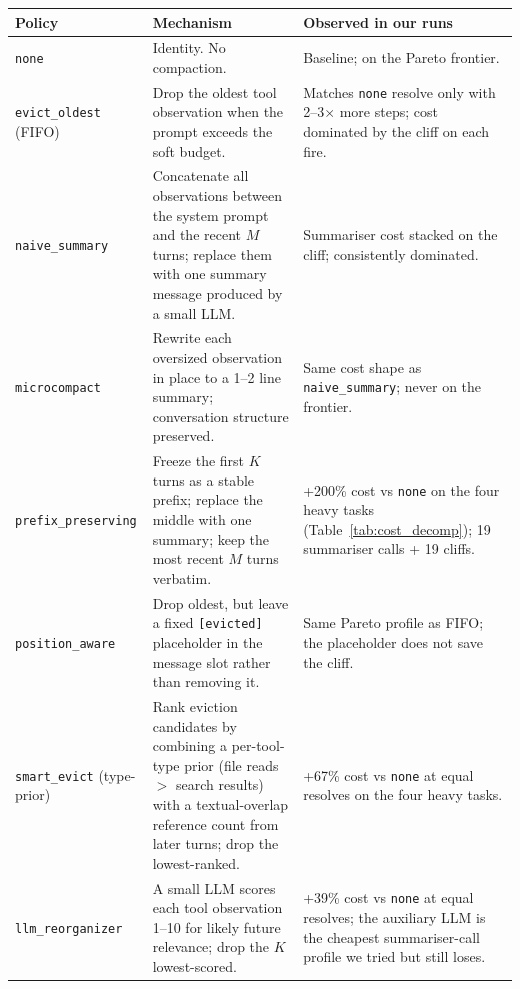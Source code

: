 \documentclass[letterpaper,twocolumn,10pt]{article}
\begin{document}
\begin{table}[t]
\centering\small
\setlength{\tabcolsep}{6pt}
\begin{tabular}{p{} p{} p{}}
\toprule
\textbf{Policy} & \textbf{Mechanism} & \textbf{Observed in our runs} \\
\midrule
\texttt{none} &
Identity. No compaction. &
Baseline; on the Pareto frontier. \\

\texttt{evict\_oldest} (FIFO) &
Drop the oldest tool observation when the prompt exceeds the soft budget. &
Matches \texttt{none} resolve only with 2--3$\times$ more steps; cost dominated by the cliff on each fire. \\

\texttt{naive\_summary} &
Concatenate all observations between the system prompt and the recent $M$ turns; replace them with one summary message produced by a small LLM. &
Summariser cost stacked on the cliff; consistently dominated. \\

\texttt{microcompact} &
Rewrite each oversized observation in place to a 1--2 line summary; conversation structure preserved. &
Same cost shape as \texttt{naive\_summary}; never on the frontier. \\

\texttt{prefix\_preserving} &
Freeze the first $K$ turns as a stable prefix; replace the middle with one summary; keep the most recent $M$ turns verbatim. &
+200\% cost vs \texttt{none} on the four heavy tasks (Table~\ref{tab:cost_decomp}); 19 summariser calls + 19 cliffs. \\

\texttt{position\_aware} &
Drop oldest, but leave a fixed \texttt{[evicted]} placeholder in the message slot rather than removing it. &
Same Pareto profile as FIFO; the placeholder does not save the cliff. \\

\texttt{smart\_evict} (type-prior) &
Rank eviction candidates by combining a per-tool-type prior (file reads $>$ search results) with a textual-overlap reference count from later turns; drop the lowest-ranked. &
+67\% cost vs \texttt{none} at equal resolves on the four heavy tasks. \\

\texttt{llm\_reorganizer} &
A small LLM scores each tool observation 1--10 for likely future relevance; drop the $K$ lowest-scored. &
+39\% cost vs \texttt{none} at equal resolves; the auxiliary LLM is the cheapest summariser-call profile we tried but still loses. \\


\end{tabular}
\end{table}
\end{document}
